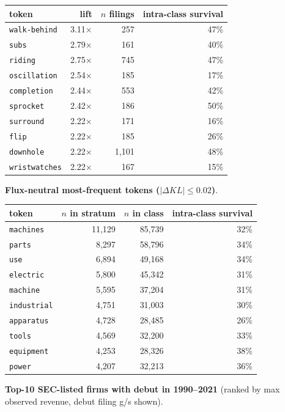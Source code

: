 \begin{tabular}{lrrr}
\toprule
token & lift & $n$ filings & intra-class survival \\
\midrule
\texttt{walk-behind} & 3.11$\times$ & 257 & 47\% \\
\texttt{subs} & 2.79$\times$ & 161 & 40\% \\
\texttt{riding} & 2.75$\times$ & 745 & 47\% \\
\texttt{oscillation} & 2.54$\times$ & 185 & 17\% \\
\texttt{completion} & 2.44$\times$ & 553 & 42\% \\
\texttt{sprocket} & 2.42$\times$ & 186 & 50\% \\
\texttt{surround} & 2.22$\times$ & 171 & 16\% \\
\texttt{flip} & 2.22$\times$ & 185 & 26\% \\
\texttt{downhole} & 2.22$\times$ & 1,101 & 48\% \\
\texttt{wristwatches} & 2.22$\times$ & 167 & 15\% \\
\bottomrule
\end{tabular}

\textbf{Flux-neutral most-frequent tokens ($|\Delta KL|\leq 0.02$)}.

\begin{tabular}{lrrr}
\toprule
token & $n$ in stratum & $n$ in class & intra-class survival \\
\midrule
\texttt{machines} & 11,129 & 85,739 & 32\% \\
\texttt{parts} & 8,297 & 58,796 & 34\% \\
\texttt{use} & 6,894 & 49,168 & 34\% \\
\texttt{electric} & 5,800 & 45,342 & 31\% \\
\texttt{machine} & 5,595 & 37,204 & 31\% \\
\texttt{industrial} & 4,751 & 31,003 & 30\% \\
\texttt{apparatus} & 4,728 & 28,485 & 26\% \\
\texttt{tools} & 4,569 & 32,200 & 33\% \\
\texttt{equipment} & 4,253 & 28,326 & 38\% \\
\texttt{power} & 4,207 & 32,213 & 36\% \\
\bottomrule
\end{tabular}

\textbf{Top-10 SEC-listed firms with debut in 1990--2021} (ranked by max observed revenue, debut filing g/s shown).

